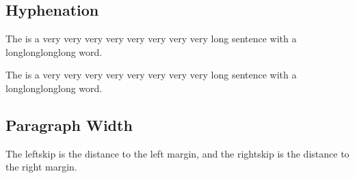 \documentclass{article}
\begin{document}
        \subsection{Hyphenation}
            The is a very very very very very very very very 
            long sentence with a longlonglonglong word. \par
            The is a very very very very very very very very 
            long sentence with a long\-longlonglong word. 
        \subsection{Paragraph Width}
            {
                \setlength\leftskip{10cm}
                \setlength\rightskip{2cm}
                The leftskip is the distance to the left margin, 
                and the rightskip is the distance to the right margin. 
            }
\end{document}

